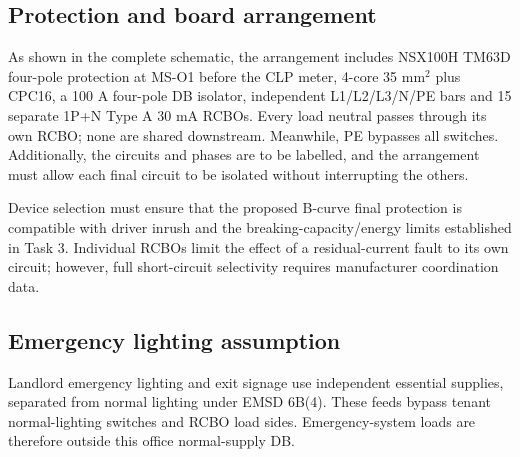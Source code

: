 \subsection*{Protection and board arrangement}
As shown in the complete schematic, the arrangement includes NSX100H TM63D four-pole protection at MS-O1 before the CLP meter, 4-core 35 mm$^2$ plus CPC16, a 100 A four-pole DB isolator, independent L1/L2/L3/N/PE bars and 15 separate 1P+N Type A 30 mA RCBOs. Every load neutral passes through its own RCBO;  none are shared downstream. Meanwhile, PE bypasses all switches. Additionally, the circuits and phases are to be labelled, and the arrangement must allow each final circuit to be isolated without interrupting the others.

Device selection must ensure that the proposed B-curve final protection is compatible with driver inrush and the breaking-capacity/energy limits established in Task 3. Individual RCBOs limit the effect of a residual-current fault to its own circuit; however, full short-circuit selectivity requires manufacturer coordination data.
\subsection*{Emergency lighting assumption}
Landlord emergency lighting and exit signage use independent essential supplies, separated from normal lighting under EMSD 6B(4). These feeds bypass tenant normal-lighting switches and RCBO load sides. Emergency-system loads are therefore outside this office normal-supply DB.
